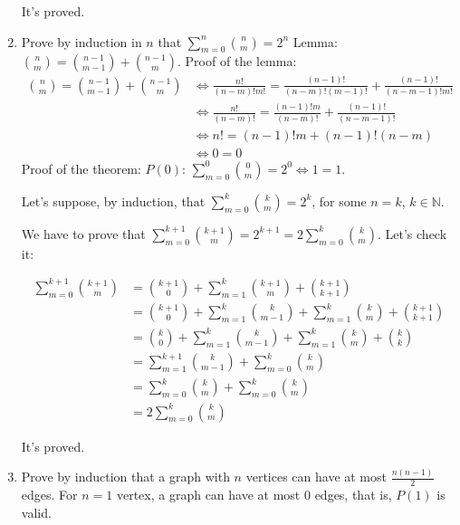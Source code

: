 \documentclass{article}
\begin{document}
\begin{enumerate}
  It's proved.
  \bigbreak
  \item Prove by induction in $n$ that \(\sum_{m=0}^{n}{n \choose m}=2^n\)
  \bigbreak
  Lemma: ${n \choose m} = {n - 1 \choose m - 1} + {n - 1 \choose m}$.
  \bigbreak
  Proof of the lemma:
  \begin{equation*}
      \begin{aligned}
        {n \choose m} = {n - 1 \choose m - 1} + {n - 1 \choose m} &\iff \frac{n!}{(n - m)!m!} = \frac{(n - 1)!}{(n - m)!(m - 1)!} + \frac{(n - 1)!}{(n - m - 1)!m!}\\
        &\iff \frac{n!}{(n - m)!} = \frac{(n - 1)!m}{(n - m)!} + \frac{(n - 1)!}{(n - m - 1)!}\\
        &\iff n! = (n - 1)!m + (n - 1)!(n - m)\\
        &\iff 0 = 0
      \end{aligned}
  \end{equation*}
  \bigbreak
  Proof of the theorem:
  \bigbreak
  $P(0)$: $\sum_{m=0}^{0}{0 \choose m}=2^0 \iff 1 = 1$.
  
  Let's suppose, by induction, that $\sum_{m=0}^{k}{k\choose m}=2^k$, for some $n = k$, $k \in \mathbb{N}$.
  
  We have to prove that $\sum_{m=0}^{k + 1}{k + 1\choose m}=2^{k + 1} = 2\sum_{m=0}^{k}{k\choose m}$. Let's check it:
  
  \begin{equation*}
      \begin{aligned}
        \sum_{m=0}^{k + 1}{k + 1\choose m} &= {k + 1 \choose 0} + \sum_{m=1}^k {k + 1\choose m} + {k + 1 \choose k + 1}\\
        &= {k + 1 \choose 0} + \sum_{m=1}^k {k\choose m - 1} + \sum_{m=1}^k {k \choose m} + {k + 1 \choose k + 1}\\
        &= {k \choose 0} + \sum_{m=1}^k {k\choose m - 1} + \sum_{m=1}^k {k \choose m} + {k \choose k}\\
        &= \sum_{m=1}^{k + 1} {k\choose m - 1} + \sum_{m=0}^k {k \choose m}\\
        &= \sum_{m=0}^k {k\choose m} + \sum_{m=0}^k {k \choose m}\\
        &= 2\sum_{m=0}^k {k\choose m}
      \end{aligned}
  \end{equation*}
  
  It's proved.
  \bigbreak
  \item Prove by induction that a graph with $n$ vertices can have at most  $\frac{n(n-1)}{2}$ edges.
  \bigbreak
  For $n = 1$ vertex, a graph can have at most $0$ edges, that is, $P(1)$ is valid.
  

\end{enumerate}
\end{document}
